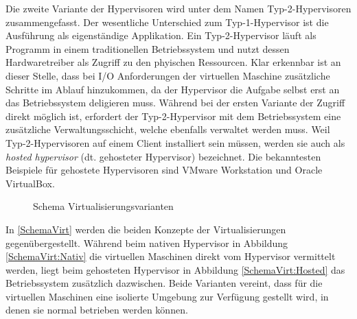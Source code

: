 Die zweite Variante der Hypervisoren wird unter dem Namen Typ-2-Hypervisoren zusammengefasst. Der wesentliche Unterschied zum Typ-1-Hypervisor ist die Ausführung als eigenständige Applikation. Ein Typ-2-Hypervisor läuft als Programm in einem traditionellen Betriebssystem und nutzt dessen Hardwaretreiber als Zugriff zu den phyischen Ressourcen. Klar erkennbar ist an dieser Stelle, dass bei I/O Anforderungen der virtuellen Maschine zusätzliche Schritte im Ablauf hinzukommen, da der Hypervisor die Aufgabe selbst erst an das Betriebssystem deligieren muss. Während bei der ersten Variante der Zugriff direkt möglich ist, erfordert der Typ-2-Hypervisor mit dem Betriebssystem eine zusätzliche Verwaltungsschicht, welche ebenfalls verwaltet werden muss. Weil Typ-2-Hypervisoren auf einem Client installiert sein müssen, werden sie auch als \textit{hosted hypervisor} (dt. gehosteter Hypervisor) bezeichnet. Die bekanntesten Beispiele für gehostete Hypervisoren sind VMware Workstation und Oracle VirtualBox. \cite[S.~45]{Portnoy2012}
\begin{figure}[H]
    \centering
    \hspace{0.15\textwidth}
    \caption[Schema Virtualisierungsvarianten]{Schema Virtualisierungsvarianten \cite[S.~13]{SiemensIndustryOnlineSupport2018}}
    \label{SchemaVirt}
\end{figure}
In \autoref{SchemaVirt} werden die beiden Konzepte der Virtualisierungen gegenübergestellt. Während beim nativen Hypervisor in Abbildung \autoref{SchemaVirt:Nativ} die virtuellen Maschinen direkt vom Hypervisor vermittelt werden, liegt beim gehosteten Hypervisor in Abbildung \autoref{SchemaVirt:Hosted} das Betriebssystem zusätzlich dazwischen. Beide Varianten vereint, dass für die virtuellen Maschinen eine isolierte Umgebung zur Verfügung gestellt wird, in denen sie normal betrieben werden können.
